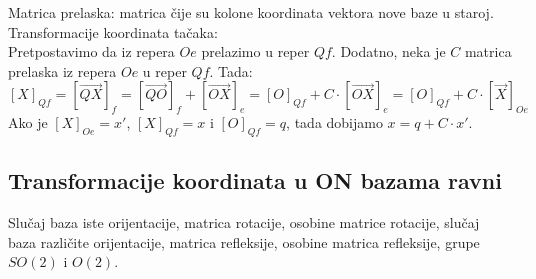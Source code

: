 \documentclass[12pt]{article}
\newcommand{\vek}[1]{\overrightarrow{#1}}
\begin{document}
\vspace*{1cm}

Matrica prelaska: matrica čije su kolone koordinata vektora nove baze u staroj.\\
Transformacije koordinata tačaka:\\
Pretpostavimo da iz repera $Oe$ prelazimo u reper $Qf$. Dodatno, neka je
$C$ matrica prelaska iz repera $Oe$ u reper $Qf$. Tada:
$$[X]_{Qf}  =[\vek{QX}]_f =[\vek{QO}]_f+[\vek{OX}]_e =[O]_{Qf}+C\cdot[\vek{OX}]_e =[O]_{Qf}+C\cdot[\vek{X}]_{Oe}$$
Ako je $[X]_{Oe}=x'$, $[X]_{Qf}=x$ i $[O]_{Qf}=q$, tada dobijamo $x=q+C\cdot x'$.
\par

\subsection{Transformacije koordinata u ON bazama ravni}
\label{subsec:pitanje_9}
Slučaj baza iste orijentacije, matrica rotacije, osobine matrice
rotacije, slučaj baza različite orijentacije, matrica refleksije,
osobine matrica refleksije, grupe $SO(2)$ i $O(2)$.\par

\vspace*{1cm}
\end{document}
